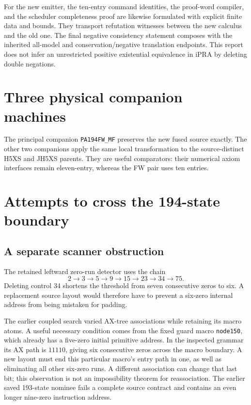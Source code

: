 \documentclass[11pt,a4paper]{article}
\theoremstyle{definition}\newtheorem{definition}[theorem]{Definition}
\theoremstyle{remark}\newtheorem{remark}[theorem]{Remark}
\newcommand{\file}[1]{\nolinkurl{#1}}
\begin{document}
For the new emitter, the ten-entry command identities, the proof-word
compiler, and the scheduler completeness proof are likewise formulated
with explicit finite data and bounds. They transport refutation witnesses
between the new calculus and the old one. The final negative consistency
statement composes with the inherited all-model and conservation/negative
translation endpoints. This report does not infer an unrestricted positive
existential equivalence in iPRA by deleting double negations.

\section{Three physical companion machines}

The principal companion \texttt{PA194FW\_MF} preserves the new fused
source exactly. The other two companions apply the same local
transformation to the source-distinct H5XS and JH5XS parents. They are useful
comparators: their numerical axiom interfaces remain eleven-entry,
whereas the FW pair uses ten entries.



\section{Attempts to cross the 194-state boundary}




\subsection{A separate scanner obstruction}

The retained leftward zero-run detector uses the chain
\[
 2\to3\to5\to9\to15\to23\to34\to75.
\]
Deleting control 34 shortens the threshold from seven consecutive zeros
to six. A replacement source layout would therefore have to prevent a
six-zero internal address from being mistaken for padding.

The earlier coupled search varied AX-tree associations while retaining
its macro atoms. A useful necessary condition comes from the fixed guard
macro \file{node150}, which already has a five-zero initial primitive
address. In the inspected grammar its AX path is $11110$, giving six
consecutive zeros across the macro boundary. A new layout must end this
particular macro's entry path in one, as well as eliminating all other
six-zero runs. A different association can change that last bit; this
observation is not an impossibility theorem for reassociation. The earlier
saved 193-state nominee fails a complete source contract and contains an
even longer nine-zero instruction address.
\end{document}
